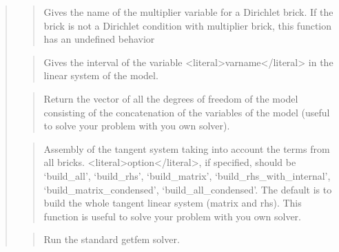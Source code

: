 \documentclass[a4paper,11pt,english]{sphinxmanual}
\begin{document}
\begin{quote}
\sphinxAtStartPar
{}
\begin{quote}

\sphinxAtStartPar
Gives the name of the multiplier variable for a Dirichlet brick.
If the brick is not a Dirichlet condition with multiplier brick,
this function has an undefined behavior
\end{quote}

\sphinxAtStartPar
{}
\begin{quote}

\sphinxAtStartPar
Gives the interval of the variable \textless{}literal\textgreater{}varname\textless{}/literal\textgreater{} in the linear system of
the model.
\end{quote}

\sphinxAtStartPar
{}
\begin{quote}

\sphinxAtStartPar
Return the vector of all the degrees of freedom of the model consisting
of the concatenation of the variables of the model (useful
to solve your problem with you own solver).
\end{quote}

\sphinxAtStartPar
{}
\begin{quote}

\sphinxAtStartPar
Assembly of the tangent system taking into account the terms
from all bricks. \textless{}literal\textgreater{}option\textless{}/literal\textgreater{}, if specified, should be ‘build\_all’,
‘build\_rhs’, ‘build\_matrix’, ‘build\_rhs\_with\_internal’,
‘build\_matrix\_condensed’, ‘build\_all\_condensed’.
The default is to build the whole tangent linear system (matrix and rhs).
This function is useful to solve your problem with you own solver.
\end{quote}

\sphinxAtStartPar
{}
\begin{quote}

\sphinxAtStartPar
Run the standard getfem solver.


\end{quote}
\end{quote}
\end{document}

